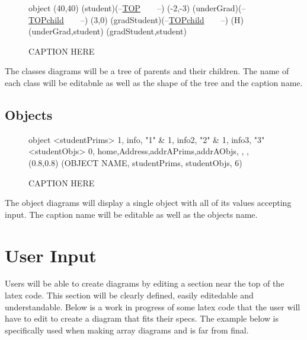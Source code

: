\documentclass[10pt,a4paper,english]{article}
\begin{document}
\begin {figure}[!htbp]
\Draw
 {object}
\MinNodeSize(40,40)
\RectNode (student)(--\underline {TOP}~~~~--)
\MoveToExit(-2,-3)
\RectNode (underGrad)(--\underline {TOPchild}~~~~--)
\MoveToExit(3,0)
\RectNode (gradStudent)(--\underline {TOPchild}~~~~--)
\ArrowSpec (H)
\Edge(underGrad,student)
\Edge(gradStudent,student)
\EndDraw
\caption {CAPTION HERE}
\label {fig:studentClasses}
\end {figure}

The classes diagrams will be a tree of parents and their children.  The name of each class will be editabnle as well as the shape of the tree and the caption name.
\newpage
\subsection*{Objects}

\begin {figure}[!htbp]
\Draw
 {object}
\Indirect \Table <studentPrims>
{  1, info, "1" 		&
   1, info2,  "2"		&
   1, info3,  "3"		
}
\Indirect \Table <studentObjs>
 {  0, home,Address,addrAPrims,addrAObjs, , , }
  \Scale (0.8,0.8)
\OD (OBJECT NAME, studentPrims, studentObjs, 6)
    \EndDraw
\caption {CAPTION HERE}
\label {fig:simpleStudent}
\end {figure}

The object diagrams will display a single object with all of its values accepting input.  The caption name will be editable as well as the objects name.

\section{User Input}
Users will be able to create diagrams by editing a section near the top of the latex code.  This section will be clearly defined, easily editedable and understandable.  Below is a work in progress of some latex code that the user will have to edit to create a diagram that fits their specs. The example below is specifically used when making array diagrams and is far from final.
\end{document}

